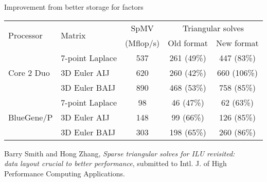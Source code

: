 \begin{frame}{Improvement from better storage for factors}
  \begin{tabular}{|l|l|c|c|c|}
    \hline
    \multirow{2}{*}{Processor} & \multirow{2}{*}{Matrix} & SpMV & \multicolumn{2}{c|}{Triangular solves} \\
    & & (Mflop/s) & Old format & New format \\
    \hline
    \multirow{3}{*}{Core 2 Duo} & 7-point Laplace & 537 & 261 (49\%) & 447 (83\%) \\
               & 3D Euler AIJ & 620 & 260 (42\%) & 660 (106\%) \\
               & 3D Euler BAIJ & 890 & 468 (53\%) & 758 (85\%) \\
    \hline
    \multirow{3}{*}{BlueGene/P} & 7-point Laplace & 98 & 46 (47\%) & 62 (63\%) \\
               & 3D Euler AIJ & 148 & 99 (66\%) & 126 (85\%) \\
               & 3D Euler BAIJ & 303 & 198 (65\%) & 260 (86\%) \\
    \hline
  \end{tabular}
  \bigskip

  {\small Barry Smith and Hong Zhang, \emph{Sparse triangular solves for ILU revisited: \\
      data layout crucial to better performance}, submitted to
    Intl. J. of High Performance Computing Applications.}
\end{frame}
